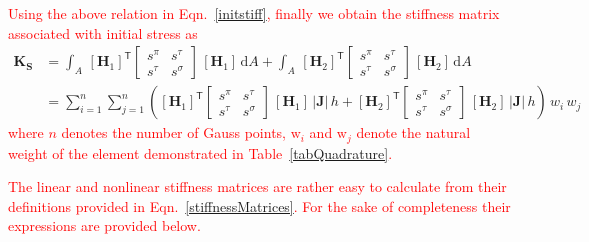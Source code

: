 \textcolor{red}{Using the above relation in Eqn.~\eqref{initstiff}, finally we obtain the stiffness matrix associated with initial stress as}
\begin{equation}
\begin{aligned}
\mathbf{K_{\mathbf{S}}} & =  \int_A \, [\mathbf{H}_1]^{\mathsf{T}}  \begin{bmatrix} s^{\pi} & s^{\tau} \\ 
s^{\tau} & s^{\sigma}
\end{bmatrix} \, [\mathbf{H}_1] \, \mathrm{d} A + \int_A \, [\mathbf{H}_2]^{\mathsf{T}}  \begin{bmatrix} s^{\pi} & s^{\tau} \\ 
s^{\tau} & s^{\sigma} 
\end{bmatrix} \, [\mathbf{H}_2] \, \mathrm{d} A\\
& =  \sum_{i=1}^{n} \sum_{j=1}^{n} \left( [\mathbf{H}_1]^{\mathsf{T}}  \begin{bmatrix} s^{\pi} & s^{\tau} \\ 
s^{\tau} & s^{\sigma}
\end{bmatrix} \, [\mathbf{H}_1] \, |\mathbf{J}| \, h  + [\mathbf{H}_2]^{\mathsf{T}}  \begin{bmatrix} s^{\pi} & s^{\tau} \\ 
s^{\tau} & s^{\sigma}
\end{bmatrix} \, [\mathbf{H}_2] \, |\mathbf{J}| \, h \right) \,  w_i \, w_j
\end{aligned}
\end{equation}
\textcolor{red}{where $n$ denotes the number of Gauss points, $\mathrm{w}_i$ and $\mathrm{w}_j$ denote the natural weight of the element demonstrated in Table~\ref{tabQuadrature}.}

\textcolor{red}{The linear and nonlinear stiffness matrices are rather easy to calculate from their definitions provided in Eqn.~\eqref{stiffnessMatrices}. For the sake of completeness their expressions are provided below.}


